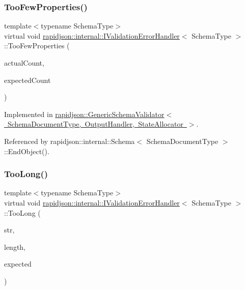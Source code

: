 \subsubsection{\texorpdfstring{TooFewProperties()}{TooFewProperties()}}
{\footnotesize\ttfamily template$<$typename Schema\+Type$>$ \\
virtual void \mbox{\hyperlink{classrapidjson_1_1internal_1_1_i_validation_error_handler}{rapidjson\+::internal\+::\+I\+Validation\+Error\+Handler}}$<$ Schema\+Type $>$\+::Too\+Few\+Properties (\begin{DoxyParamCaption}\item[{\mbox{\hyperlink{namespacerapidjson_a44eb33eaa523e36d466b1ced64b85c84}{Size\+Type}}}]{actual\+Count,  }\item[{\mbox{\hyperlink{namespacerapidjson_a44eb33eaa523e36d466b1ced64b85c84}{Size\+Type}}}]{expected\+Count }\end{DoxyParamCaption})\hspace{0.3cm}{\ttfamily [pure virtual]}}



Implemented in \mbox{\hyperlink{classrapidjson_1_1_generic_schema_validator_aa7c129bc7d97e65c23e8d6733c331a9d}{rapidjson\+::\+Generic\+Schema\+Validator$<$ Schema\+Document\+Type, Output\+Handler, State\+Allocator $>$}}.



Referenced by rapidjson\+::internal\+::\+Schema$<$ Schema\+Document\+Type $>$\+::\+End\+Object().

\mbox{\label{classrapidjson_1_1internal_1_1_i_validation_error_handler_a9e26e52da7914dd0a9e7a4e06db8943c}} 
\subsubsection{\texorpdfstring{TooLong()}{TooLong()}}
{\footnotesize\ttfamily template$<$typename Schema\+Type$>$ \\
virtual void \mbox{\hyperlink{classrapidjson_1_1internal_1_1_i_validation_error_handler}{rapidjson\+::internal\+::\+I\+Validation\+Error\+Handler}}$<$ Schema\+Type $>$\+::Too\+Long (\begin{DoxyParamCaption}\item[{const \mbox{\hyperlink{classrapidjson_1_1internal_1_1_i_validation_error_handler_a02c672a313401138fd08504062f3d1d0}{Ch}} $\ast$}]{str,  }\item[{\mbox{\hyperlink{namespacerapidjson_a44eb33eaa523e36d466b1ced64b85c84}{Size\+Type}}}]{length,  }\item[{\mbox{\hyperlink{namespacerapidjson_a44eb33eaa523e36d466b1ced64b85c84}{Size\+Type}}}]{expected }\end{DoxyParamCaption})\hspace{0.3cm}{\ttfamily [pure virtual]}}



